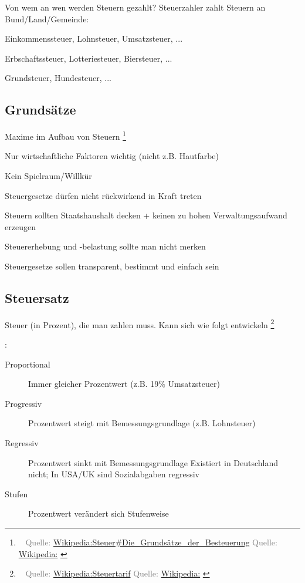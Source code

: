 \documentclass{beamer}
\let\oldfootnote\footnote
\renewcommand{\footnote}[1]
{%
	\oldfootnote
	{
		\tiny
		\textcolor{gray}{\ #1}
	}%
}
\newcommand{\citewiki}[2][]
{%
	\footnote
	{
		\ifthenelse{\isempty{#1}}
		{
			Quelle: \href{https://de.wikipedia.org/wiki/#2}{Wikipedia:#2}
		}
		{
			Quelle: \href{https://de.wikipedia.org/wiki/#2}{Wikipedia:#1}
		}
	}
}
\begin{document}
			\begin{frame}{Von wem an wen werden Steuern gezahlt?}
				Steuerzahler zahlt Steuern an Bund/Land/Gemeinde:\n
				
				\begin{description}[An Gemeinde]
					\item[An Bund] Einkommenssteuer, Lohnsteuer, Umsatzsteuer, ...
					\item[An Land] Erbschaftssteuer, Lotteriesteuer, Biersteuer, ...
					\item[An Gemeinde] Grundsteuer, Hundesteuer, ...
				\end{description}
			\end{frame}
		
		\subsection{Grundsätze}
	
			\begin{frame}{Maxime im Aufbau von Steuern\citewiki{Steuer\#Die\_Grundsätze\_der\_Besteuerung}}
				\begin{description}[labelwidth=0cm]
					\item[Gerechtigkeit] Nur wirtschaftliche Faktoren wichtig (nicht z.B. Hautfarbe)
					\item[Gleichmäßigkeit] Kein Spielraum/Willkür
					\item[Rückwirkungsverbot] Steuergesetze dürfen nicht rückwirkend in Kraft treten
					\item[Ergiebigkeit] Steuern sollten Staatshaushalt decken + keinen zu hohen Verwaltungsaufwand erzeugen
					\item[Unmerklichkeit] Steuererhebung und -belastung sollte man nicht merken
					\item[Praktikabilität] Steuergesetze sollen transparent, bestimmt und einfach sein
				\end{description}
			\end{frame}
	
	\subsection{Steuersatz}
	
		\begin{frame}
			Steuer (in Prozent), die man zahlen muss. Kann sich wie folgt entwickeln\citewiki{Steuertarif}:\n
			\begin{description}
				\item[Proportional] Immer gleicher Prozentwert (z.B. 19\% Umsatzsteuer)
				\item[Progressiv] Prozentwert steigt mit Bemessungsgrundlage (z.B. Lohnsteuer)
				\item[Regressiv] Prozentwert sinkt mit Bemessungsgrundlage \vspace{0.1cm}\newline
				{\tiny Existiert in Deutschland nicht; In USA/UK sind Sozialabgaben regressiv\\}
				\item[Stufen] Prozentwert verändert sich Stufenweise
			\end{description}
		\end{frame}
	
\end{document}
